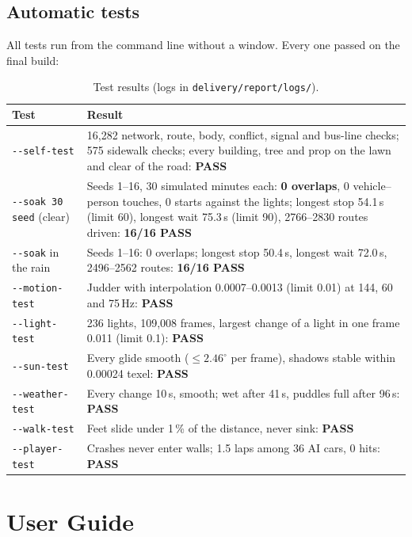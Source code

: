 \documentclass[11pt,a4paper]{article}
\newcommand{\code}[1]{\texttt{\small #1}}
\begin{document}
\subsection{Automatic tests}
All tests run from the command line without a window. Every one passed on the final build:
\begin{table}[H]
\centering\small
\begin{tabularx}{\textwidth}{@{}l X@{}}
\toprule
Test & Result \\ \midrule
\code{-{}-self-test} & 16,282 network, route, body, conflict, signal and bus-line checks; 575 sidewalk checks; every building, tree and prop on the lawn and clear of the road: \textbf{PASS} \\
\code{-{}-soak 30 seed} (clear) & Seeds 1--16, 30 simulated minutes each: \textbf{0 overlaps}, 0 vehicle--person touches, 0 starts against the lights; longest stop 54.1\,s (limit 60), longest wait 75.3\,s (limit 90), 2766--2830 routes driven: \textbf{16/16 PASS} \\
\code{-{}-soak} in the rain & Seeds 1--16: 0 overlaps; longest stop 50.4\,s, longest wait 72.0\,s, 2496--2562 routes: \textbf{16/16 PASS} \\
\code{-{}-motion-test} & Judder with interpolation 0.0007--0.0013 (limit 0.01) at 144, 60 and 75\,Hz: \textbf{PASS} \\
\code{-{}-light-test} & 236 lights, 109,008 frames, largest change of a light in one frame 0.011 (limit 0.1): \textbf{PASS} \\
\code{-{}-sun-test} & Every glide smooth ($\le 2.46^\circ$ per frame), shadows stable within 0.00024 texel: \textbf{PASS} \\
\code{-{}-weather-test} & Every change 10\,s, smooth; wet after 41\,s, puddles full after 96\,s: \textbf{PASS} \\
\code{-{}-walk-test} & Feet slide under 1\,\% of the distance, never sink: \textbf{PASS} \\
\code{-{}-player-test} & Crashes never enter walls; 1.5 laps among 36 AI cars, 0 hits: \textbf{PASS} \\
\bottomrule
\end{tabularx}
\caption{Test results (logs in \code{delivery/report/logs/}).}
\end{table}

\section{User Guide}
\end{document}
